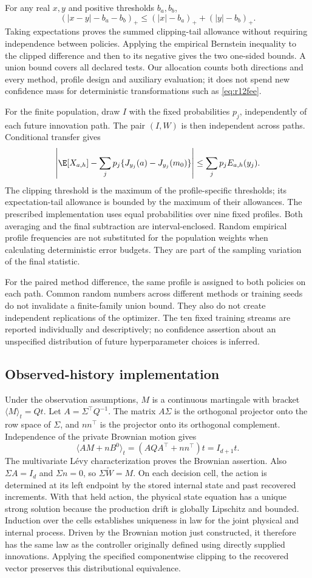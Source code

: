 For any real $x,y$ and positive thresholds $b_a,b_b$,
\[
 (|x-y|-b_a-b_b)_+
       \leq (|x|-b_a)_++(|y|-b_b)_+.
\]
Taking expectations proves the summed clipping-tail allowance without requiring independence between policies. Applying the empirical Bernstein inequality to the clipped difference and then to its negative gives the two one-sided bounds. A union bound covers all declared tests. Our allocation counts both directions and every method, profile design and auxiliary evaluation; it does not spend new confidence mass for deterministic transformations such as \eqref{eq:r12fee}.

For the finite population, draw $I$ with the fixed probabilities $p_j$, independently of each future innovation path. The pair $(I,W)$ is then independent across paths. Conditional transfer gives
\[
 \left|\E[X_{a,h}]-\sum_jp_j\{J_{y_j}(a)-J_{y_j}(m_0)\}\right|
       \leq\sum_jp_j E_{a,h}(y_j).
\]
The clipping threshold is the maximum of the profile-specific thresholds; its expectation-tail allowance is bounded by the maximum of their allowances. The prescribed implementation uses equal probabilities over nine fixed profiles. Both averaging and the final subtraction are interval-enclosed. Random empirical profile frequencies are not substituted for the population weights when calculating deterministic error budgets. They are part of the sampling variation of the final statistic.

For the paired method difference, the same profile is assigned to both policies on each path. Common random numbers across different methods or training seeds do not invalidate a finite-family union bound. They also do not create independent replications of the optimizer. The ten fixed training streams are reported individually and descriptively; no confidence assertion about an unspecified distribution of future hyperparameter choices is inferred.

\subsection{Observed-history implementation}
Under the observation assumptions, $M$ is a continuous martingale with bracket $\langle M\rangle_t=Qt$. Let $A=\Sigma^\top Q^{-1}$. The matrix $A\Sigma$ is the orthogonal projector onto the row space of $\Sigma$, and $nn^\top$ is the projector onto its orthogonal complement. Independence of the private Brownian motion gives
\[
 \langle AM+nB^0\rangle_t
       =(AQA^\top+nn^\top)t=I_{d+1}t.
\]
The multivariate L\'evy characterization proves the Brownian assertion. Also $\Sigma A=I_d$ and $\Sigma n=0$, so $\Sigma\widetilde W=M$. On each decision cell, the action is determined at its left endpoint by the stored internal state and past recovered increments. With that held action, the physical state equation has a unique strong solution because the production drift is globally Lipschitz and bounded. Induction over the cells establishes uniqueness in law for the joint physical and internal process. Driven by the Brownian motion just constructed, it therefore has the same law as the controller originally defined using directly supplied innovations. Applying the specified componentwise clipping to the recovered vector preserves this distributional equivalence.

